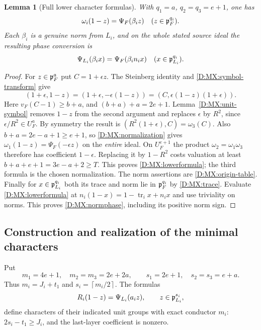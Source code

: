 \documentclass[11pt]{amsart}
\newtheorem{lemma}[theorem]{Lemma}
\theoremstyle{definition}
\theoremstyle{remark}
\newcommand{\ceil}[1]{\left\lceil #1\right\rceil}
\begin{document}
\begin{lemma}[Full lower character formulas]\label{D:MX:lower}
With $q_1=a$, $q_2=q_3=e+1$, one has
\begin{equation}\label{D:MX:lowerformula}
 \omega_i(1-z)=\Psi_F(\beta_i z)\quad(z\in\mathfrak p_F^{q_i}).
\end{equation}
Each $\beta_i$ is a genuine norm from $L_i$, and on the whole stated source
ideal the resulting phase conversion is
\begin{equation}\label{D:MX:normphase}
 \Psi_{L_i}(\beta_i x)=\Psi_F(\beta_i n_i x)
                    \quad(x\in\mathfrak p_{L_i}^{q_i}).
\end{equation}
\end{lemma}
\begin{proof}
For $z\in\mathfrak p_F^a$ put $C=1+\epsilon z$. The Steinberg identity and
\eqref{D:MX:symbol-transform} give
\[
 (1+\epsilon,1-z)
 =(1+\epsilon,-\epsilon(1-z))
 =(C,\epsilon(1-z)(1+\epsilon)).
\]
Here $v_F(C-1)\ge b+a$, and $(b+a)+a=2e+1$.
Lemma~\ref{D:MX:unit-symbol} removes $1-z$ from the second argument and replaces
$\epsilon$ by $R^2$, since $\epsilon/R^2\in U_F^a$. By symmetry the result
is $(R^2(1+\epsilon),C)=\omega_3(C)$.
Also $b+a=2e-a+1\ge e+1$, so \eqref{D:MX:normalization} gives
$\omega_1(1-z)=\Psi_F(-\epsilon z)$ on the \emph{entire} ideal.
On $U_F^{e+1}$ the product $\omega_2=\omega_1\omega_3$ therefore has
coefficient $1-\epsilon$. Replacing it by $1-R^2$ costs valuation at least
$b+a+e+1=3e-a+2\ge T$. This proves \eqref{D:MX:lowerformula}; the third formula
is the chosen normalization.
The norm assertions are \eqref{D:MX:origin-table}. Finally for
$x\in\mathfrak p_{L_i}^{q_i}$ both its trace and norm lie in $\mathfrak p_F^{q_i}$ by
\eqref{D:MX:trace}. Evaluate \eqref{D:MX:lowerformula} at
$n_i(1-x)=1-\operatorname{tr}_i x+n_i x$ and use triviality on norms.
This proves \eqref{D:MX:normphase}, including its positive norm sign.
\end{proof}

\subsection{Construction and realization of the minimal characters}
Put
\begin{equation}\label{D:MX:core-depths}
 m_1=4e+1,\quad m_2=m_3=2e+2a,\qquad
 s_1=2e+1,\quad s_2=s_3=e+a.
\end{equation}
Thus $m_i=J_i+t_1$ and $s_i=\ceil{m_i/2}$.
The formulas
\begin{equation}\label{D:MX:R}
 R_i(1-z)=\Psi_{L_i}(a_i z),\qquad z\in\mathfrak p_{L_i}^{s_i},
\end{equation}
define characters of their indicated unit groups with exact conductor
$m_i$: $2s_i-t_1\ge J_i$, and the last-layer coefficient is nonzero.
\end{document}

